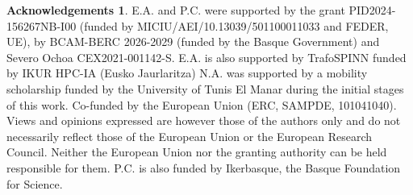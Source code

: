 \documentclass[10pt,a4paper]{amsart}
\theoremstyle{remark}
\theoremstyle{definition}
\newtheorem*{acknowledgements}{Acknowledgements}
\begin{document}
\sloppy
\begin{acknowledgements}
E.A. and P.C. were supported by the grant PID2024-156267NB-I00 (funded by 
MICIU/AEI/10.13039/501100011033 and FEDER, UE), by BCAM-BERC 2026-2029
(funded by the Basque Government) and Severo Ochoa CEX2021-001142-S.
E.A. is also supported by TrafoSPINN funded by IKUR HPC-IA (Eusko Jaurlaritza)
N.A. was supported by a mobility scholarship funded by the University of Tunis El Manar during the initial stages of this work. Co-funded by the European Union (ERC, SAMPDE, 101041040). Views and opinions expressed are however those of the authors only and do not necessarily reflect those of the European Union or the European Research Council. Neither the European Union nor the granting authority can be held responsible for them. P.C. is also funded by Ikerbasque, the Basque Foundation for Science.
\end{acknowledgements}


{}

\end{document}
